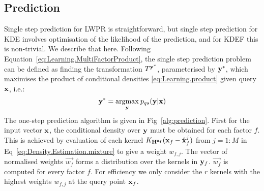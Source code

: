 

\subsection{Prediction}
Single step prediction for LWPR is straightforward, but single step prediction for KDE involves optimisation of the likelihood of the prediction, and for KDEF this is non-trivial. We describe that here. Following Equation~\eqref{eq:Learning.MultiFactorProduct},
the single step prediction problem can be defined as finding the
transformation $T^{\mathbf{y}^*}$, parameterised by $\mathbf{y}^*$, which maximises the product of conditional densities
\eqref{eq:Learning.product} given query $\mathbf{x}$, i.e.:
\begin{equation}
 \by^*= \argmax{\by} p_{qs}(\by|\bx)
\label{eq:Density.Estimation.max}
\end{equation}
The one-step prediction algorithm is given in Fig~\ref{alg:prediction}. First for the input vector $\mathbf{x}$, the conditional density over $\mathbf{y}$ must be obtained for each factor $f$. This is achieved by evaluation of each kernel  $K_{\mathbf{H^{\mathbf{x}_f}}}(\mathbf{x}_f - \hat{\mathbf{x}}_f^j)$ from $j=1:M$ in Eq~\eqref{eq:Density.Estimation.mixture} to give a weight $w_{f,j}$. The vector of normalised weights $\vec{w_f}$ forms a distribution over the kernels in $\mathbf{y}_f$. $\vec{w_f}$ is computed for every factor $f$. For efficiency we only consider the $r$ kernels with the highest weights $w_{f,j}$ at the query point $\mathbf{x}_f$. 

